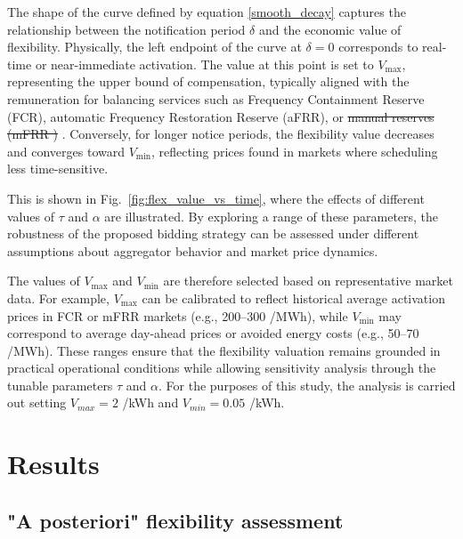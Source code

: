 \documentclass[preprint,12pt]{elsarticle}
\makeatletter
\providecommand{\DIFaddtex}[1]{{\protect\color{blue}\uwave{#1}}} %
\providecommand{\DIFdeltex}[1]{{\protect\color{red}\sout{#1}}} %
\providecommand{\DIFaddbegin}{} %
\providecommand{\DIFaddend}{} %
\providecommand{\DIFdelbegin}{} %
\providecommand{\DIFdelend}{} %
\providecommand{\DIFadd}[1]{\texorpdfstring{\DIFaddtex{#1}}{#1}} %
\providecommand{\DIFdel}[1]{\texorpdfstring{\DIFdeltex{#1}}{}} %
\providecommand{\DIFscaledelfig}{0.5}
\newlength{\DIFdelgraphicswidth} %
\newlength{\DIFdelgraphicsheight} %
\providecommand{\DIFaddincludegraphics}[2][]{{\color{blue}\fbox{\DIFOincludegraphics[#1]{#2}}}} %
\providecommand{\DIFdelincludegraphics}[2][]{%
\sbox{\DIFdelgraphicsbox}{\DIFOincludegraphics[#1]{#2}}%
\settoboxwidth{\DIFdelgraphicswidth}{\DIFdelgraphicsbox} %
\settoboxtotalheight{\DIFdelgraphicsheight}{\DIFdelgraphicsbox} %
\scalebox{\DIFscaledelfig}{%
\parbox[b]{\DIFdelgraphicswidth}{\usebox{\DIFdelgraphicsbox}\\[-\baselineskip] \rule{\DIFdelgraphicswidth}{0em}}\llap{\resizebox{\DIFdelgraphicswidth}{\DIFdelgraphicsheight}{%
\setlength{\unitlength}{\DIFdelgraphicswidth}%
\begin{picture}(1,1)%
\thicklines\linethickness{2pt} %
{\color[rgb]{1,0,0}\put(0,0){\framebox(1,1){}}}%
{\color[rgb]{1,0,0}\put(0,0){\line( 1,1){1}}}%
{\color[rgb]{1,0,0}\put(0,1){\line(1,-1){1}}}%
\end{picture}%
}\hspace*{3pt}}} %
} %
\DeclareRobustCommand{\DIFaddbegin}{\DIFOaddbegin \let\includegraphics\DIFaddincludegraphics} %
\DeclareRobustCommand{\DIFaddend}{\DIFOaddend \let\includegraphics\DIFOincludegraphics} %
\DeclareRobustCommand{\DIFdelbegin}{\DIFOdelbegin \let\includegraphics\DIFdelincludegraphics} %
\DeclareRobustCommand{\DIFdelend}{\DIFOaddend \let\includegraphics\DIFOincludegraphics} %
\let\sout@orig\sout %
\renewcommand{\sout}[1]{\ifmmode\text{\sout@orig{\ensuremath{#1}}}\else\sout@orig{#1}\fi} %
\makeatother
\begin{document}
The shape of the curve defined by equation \ref{smooth_decay} captures the relationship between the notification period \( \delta \) and the economic value of flexibility. Physically, the left endpoint of the curve at \( \delta = 0 \) corresponds to real-time or near-immediate activation. The value at this point is set to \( V_{\max} \), representing the upper bound of compensation, typically aligned with the remuneration for \DIFaddbegin \DIFadd{short-term }\DIFaddend balancing services such as Frequency Containment Reserve (FCR), automatic Frequency Restoration Reserve (aFRR), or \DIFdelbegin \DIFdel{manual reserves (mFRR ) }\DIFdelend \DIFaddbegin \DIFadd{mFRR ~}\DIFaddend \cite{entsoe_balancing}. Conversely, for longer notice periods, the flexibility value decreases and converges toward \( V_{\min} \), reflecting prices found in markets where scheduling less time-sensitive.

This is shown in Fig.~\ref{fig:flex_value_vs_time}, where the effects of different values of \( \tau \) and \( \alpha \) are illustrated. By exploring a range of these parameters, the robustness of the proposed bidding strategy can be assessed under different assumptions about aggregator behavior and market price dynamics.

The values of \( V_{\max} \) and \( V_{\min} \) are therefore selected based on representative market data. For example, \( V_{\max} \) can be calibrated to reflect historical average activation prices in FCR or mFRR markets (e.g., 200–300 \texteuro/MWh), while \( V_{\min} \) may correspond to average day-ahead prices or avoided energy costs (e.g., 50–70 \texteuro/MWh). These ranges ensure that the flexibility valuation remains grounded in practical operational conditions while allowing sensitivity analysis through the tunable parameters \( \tau \) and \( \alpha \). For the purposes of this study, the analysis is carried out setting $V_{max} = 2$ \texteuro/kWh and $V_{min} = 0.05$ \texteuro/kWh.



\section{Results}\label{results}


\subsection{"A posteriori" flexibility assessment} \label{a_posteriori_results}
\end{document}
